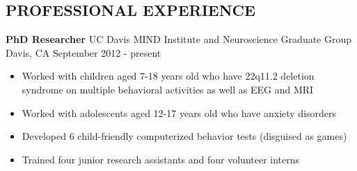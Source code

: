 \documentclass[line,margin,10pt]{res}
\begin{document}
\begin{resume}
\section{PROFESSIONAL EXPERIENCE}
\textbf{PhD Researcher} \hfill UC Davis MIND Institute and Neuroscience Graduate Group\\ 
Davis, CA \hfill September 2012 - present
\begin{itemize} \itemsep -2pt
\item Worked with children aged 7-18 years old who have 22q11.2 deletion syndrome on multiple behavioral activities as well as EEG and MRI
\item Worked with adolescents aged 12-17 years old who have anxiety disorders
\item Developed 6 child-friendly computerized behavior tests (disguised as games)
\item Trained four junior research assistants and four volunteer interns
\end{itemize}



\end{resume}
\end{document}
